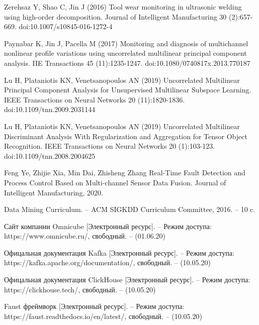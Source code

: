 \begin{thebibliography}{00}
    Zerehsaz Y, Shao C, Jin J (2016) Tool wear monitoring in ultrasonic
    welding using high-order decomposition. Journal of Intelligent
    Manufacturing 30 (2):657-669. doi:10.1007/s10845-016-1272-4

    Paynabar K, Jin J, Pacella M (2017) Monitoring and diagnosis of
    multichannel nonlinear profile variations using uncorrelated multilinear
    principal component analysis. IIE Transactions 45 (11):1235-1247.
    doi:10.1080/0740817x.2013.770187

    Lu H, Plataniotis KN, Venetsanopoulos AN (2019) Uncorrelated
    Multilinear Principal Component Analysis for Unsupervised Multilinear
    Subspace Learning. IEEE Transactions on Neural Networks 20
    (11):1820-1836. doi:10.1109/tnn.2009.2031144

    Lu H, Plataniotis KN, Venetsanopoulos AN (2019) Uncorrelated
    Multilinear Discriminant Analysis With Regularization and Aggregation
    for Tensor Object Recognition. IEEE Transactions on Neural Networks
    20 (1):103-123. doi:10.1109/tnn.2008.2004625

    Feng Ye, Zhijie Xia, Min Dai, Zhisheng Zhang
    Real-Time Fault Detection and Process Control Based
    on Multi-channel Sensor Data Fusion.
    Journal of Intelligent Manufacturing, 2020.


    Data Mining Curriculum.
    -- ACM SIGKDD Curriculum Committee, 2016. -- 10 c.

    Сайт компании Omnicube [Электронный ресурс].
    -- Режим доступа: https://www.omnicube.ru/, свободный. -- (01.06.20)

    Офицальная документация Kafka [Электронный ресурс]. 
    -- Режим доступа: https://kafka.apache.org/documentation/, свободный. -- (10.05.20)

    Офицальная документация ClickHouse [Электронный ресурс]. 
    -- Режим доступа: https://clickhouse.tech/, свободный. -- (10.05.20)
    
    Faust фреймворк [Электронный ресурс]. 
    -- Режим доступа: https://faust.readthedocs.io/en/latest/, свободный. -- (10.05.20)

\end{thebibliography}
\endgroup

\clearpage